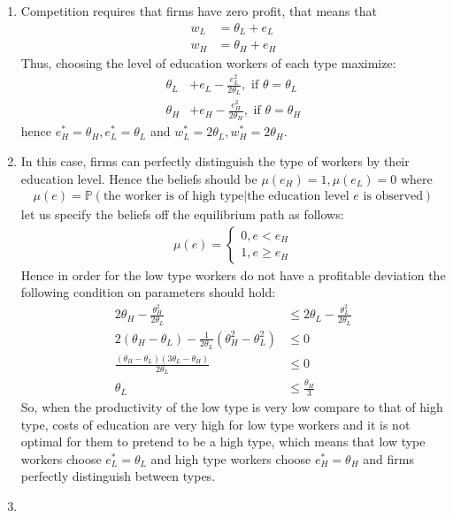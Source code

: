 \documentclass[a4paper]{article}
\newcommand{\prob}{\mathbb{P}}
\begin{document}
\begin{enumerate}
	\item Competition requires that firms have zero profit, that means that
	\begin{align*}
	w_L &= \theta_L + e_L\\
	w_H &= \theta_H + e_H
	\end{align*}
	Thus, choosing the level of education workers of each type maximize:
	\begin{align*}
	\theta_L &+ e_L - \frac{e^2_L}{2\theta_L}, \text{ if } \theta = \theta_L\\
	\theta_H &+ e_H - \frac{e^2_H}{2\theta_H}, \text{ if } \theta = \theta_H
	\end{align*}
	hence $e^*_H = \theta_H, e^*_L = \theta_L$ and $w^*_L = 2\theta_L, w^*_H = 2\theta_H$.
	\item In this case, firms can perfectly distinguish the type of workers by their education level. Hence the beliefs should be $\mu(e_H) = 1, \mu(e_L) = 0$ where
	\begin{align*}
	\mu(e) = \prob(\text{the worker is of high type}|\text{the education level } e \text{ is observed})
	\end{align*}
	let us specify the beliefs off the equilibrium path as follows:
	\begin{align*}
	\mu(e) = \begin{cases}
	0, e < e_H\\
	1, e \ge e_H
	\end{cases}
	\end{align*}
	Hence in order for the low type workers do not have a profitable deviation the following condition on parameters should hold:
	\begin{align*}
	2\theta_H - \frac{\theta_H^2}{2\theta_L} &\le 2\theta_L - \frac{\theta_L^2}{2\theta_L}\\
	2(\theta_H - \theta_L) - \frac{1}{2\theta_L}(\theta_H^2 - \theta^2_L) &\le 0\\
	\frac{(\theta_H - \theta_L)(3\theta_L - \theta_H)}{2\theta_L} &\le 0\\
	\theta_L &\le \frac{\theta_H}{3}
	\end{align*}
	So, when the productivity of the low type is very low compare to that of high type, costs of education are very high for low type workers and it is not optimal for them to pretend to be a high type, which means that low type workers choose $e^*_L = \theta_L$ and high type workers choose $e^*_H = \theta_H$ and firms perfectly distinguish between types.
	\item 

\end{enumerate}
\end{document}
